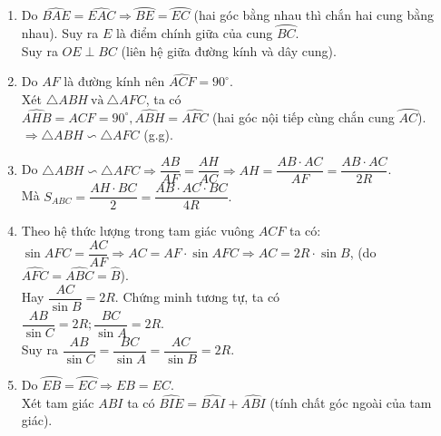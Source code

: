 \begin{bt}
{\begin{center}
		\end{center}
		\begin{enumerate}
			\item Do $\widehat{BAE}= \widehat{EAC} \Rightarrow \wideparen{BE}= \wideparen{EC}$ (hai góc bằng nhau thì chắn hai cung bằng nhau). Suy ra $E$ là điểm chính giữa của cung $\wideparen{BC}$.\\
			Suy ra $OE \perp BC$ (liên hệ giữa đường kính và dây cung).
			\item Do $AF$ là đường kính nên $\widehat{ACF}= 90^{\circ}$.\\
			Xét $\triangle ABH\ \text{và}\ \triangle AFC$, ta có\\
			$\widehat{AHB}= \widehat{ACF}= 90^{\circ}, \widehat{ABH}= \widehat{AFC}$ (hai góc nội tiếp cùng chắn cung $\wideparen{AC}$).\\
			$\Rightarrow \triangle ABH \backsim \triangle AFC$ (g.g).
			\item Do $\triangle ABH \backsim \triangle AFC \Rightarrow \dfrac{AB}{AF}= \dfrac{AH}{AC} \Rightarrow AH= \dfrac{AB \cdot AC}{AF}= \dfrac{AB \cdot AC}{2R}$.\\
			Mà $S_{ABC}= \dfrac{AH \cdot BC}{2}=\dfrac{AB \cdot AC \cdot BC}{4R}.$
			\item Theo hệ thức lượng trong tam giác vuông $ACF$ ta có:\\
			$\sin AFC= \dfrac{AC}{AF} \Rightarrow AC= AF \cdot \sin AFC \Rightarrow AC= 2R \cdot \sin B$, (do $\widehat{AFC}= \widehat{ABC}= \widehat{B}$).\\
			Hay $\dfrac{AC}{\sin B}= 2R.$ Chứng minh tương tự, ta có\\
			$\dfrac{AB}{\sin C}= 2R; \dfrac{BC}{\sin A}= 2R$.\\
			Suy ra $\dfrac{AB}{\sin C}= \dfrac{BC}{\sin A}= \dfrac{AC}{\sin B}= 2R.$
			\item Do $\wideparen{EB}= \wideparen{EC} \Rightarrow EB= EC.$\\
			Xét tam giác $ABI$ ta có $\widehat{BIE}= \widehat{BAI}+ \widehat{ABI}$ (tính chất góc ngoài của tam giác).\\

\end{enumerate}}
\end{bt}
